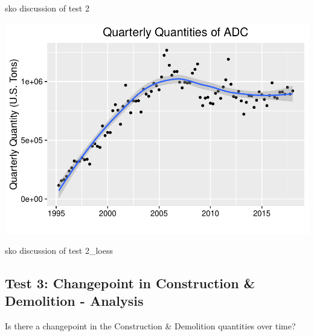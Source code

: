 \documentclass[12pt,]{article}
\begin{document}
sko discussion of test 2

\includegraphics{SKo_Project_Template_files/figure-latex/Test2_3-1.pdf}

sko discussion of test 2\_loess

\subsection{Test 3: Changepoint in Construction \& Demolition -
Analysis}\label{test-3-changepoint-in-construction-demolition---analysis}

Is there a changepoint in the Construction \& Demolition quantities over
time?
\end{document}
